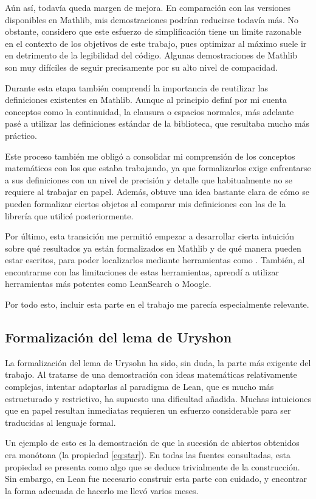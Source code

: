 Aún así, todavía queda margen de mejora. En comparación con las versiones disponibles en Mathlib, mis demostraciones podrían reducirse todavía más. No obstante, considero que este esfuerzo de simplificación tiene un límite razonable en el contexto de los objetivos de este trabajo, pues optimizar al máximo suele ir en detrimento de la legibilidad del código. Algunas demostraciones de Mathlib son muy difíciles de seguir precisamente por su alto nivel de compacidad.

Durante esta etapa también comprendí la importancia de reutilizar las definiciones existentes en Mathlib. Aunque al principio definí por mi cuenta conceptos como la continuidad, la clausura o espacios normales, más adelante pasé a utilizar las definiciones estándar de la biblioteca, que resultaba mucho más práctico.

Este proceso también me obligó a consolidar mi comprensión de los conceptos matemáticos con los que estaba trabajando, ya que formalizarlos exige enfrentarse a sus definiciones con un nivel de precisión y detalle que habitualmente no se requiere al trabajar en papel. Además, obtuve una idea bastante clara de cómo se pueden formalizar ciertos objetos al comparar mis definiciones con las de la librería que utilicé posteriormente.

Por último, esta transición me permitió empezar a desarrollar cierta intuición sobre qué resultados ya están formalizados en Mathlib y de qué manera pueden estar escritos, para poder localizarlos mediante herramientas como . También, al encontrarme con las limitaciones de estas herramientas, aprendí a utilizar herramientas más potentes como LeanSearch o Moogle.

Por todo esto, incluir esta parte en el trabajo me parecía especialmente relevante.

\subsection{Formalización del lema de Uryshon}

La formalización del lema de Urysohn ha sido, sin duda, la parte más exigente del trabajo. Al tratarse de una demostración con ideas matemáticas relativamente complejas, intentar adaptarlas al paradigma de Lean, que es mucho más estructurado y restrictivo, ha supuesto una dificultad añadida. Muchas intuiciones que en papel resultan inmediatas requieren un esfuerzo considerable para ser traducidas al lenguaje formal.

Un ejemplo de esto es la demostración de que la sucesión de abiertos obtenidos era monótona (la propiedad \ref{eq:star}). En todas las fuentes consultadas, esta propiedad se presenta como algo que se deduce trivialmente de la construcción. Sin embargo, en Lean fue necesario construir esta parte con cuidado, y encontrar la forma adecuada de hacerlo me llevó varios meses.

